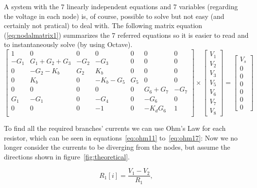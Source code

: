 A system with the 7 linearly independent equations and 7 variables (regarding the voltage in each node) is, of course, possible to solve but not easy (and certainly not pratical) to deal with. The following matrix equation (\ref{eq:nodalmatrix1}) summarizes the 7 referred equations so it is easier to read and to instantaneously solve (by using Octave).
\begin{equation}
\left[ \begin{array}{ccccccc} 
		1 & 0 & 0 & 0 & 0 & 0 & 0 \\ 
		-G_1 & G_1+G_2+G_3 & -G_2 & -G_3 & 0 & 0 & 0 \\
		0 & -G_2-K_b & G_2 & K_b & 0 & 0 & 0 \\ 
		0 & K_b & 0 & -K_b-G_5 & G_5 & 0 & 0  \\ 
		0 & 0 & 0 & 0 & 0 & G_6+G_7 & -G_7  \\ 
		G_1 & -G_1 & 0 & -G_4 & 0 & -G_6 & 0  \\ 
		0 & 0 & 0 & -1 & 0 & -K_dG_6 & 1 \\ 

\end{array} \right]
\times \left[ \begin{array}{c} V_1 \\ V_2 \\ V_3 \\ V_5 \\ V_6 \\ V_7 \\ V_8 \end{array} \right] =
\left[ \begin{array}{c} V_s \\ 0 \\ 0 \\ 0 \\ 0 \\ 0 \\ 0  \end{array} \right]
\label{eq:nodalmatrix1}
\end{equation}

To find all the required branches' currents we can use Ohm's Law for each resistor, which can be seen in equations~\ref{eq:ohm11} to~\ref{eq:ohm17}: Now we no longer consider the currents to be diverging from the nodes, but assume the directions shown in figure~\ref{fig:theoretical}.


\begin{equation}
  R_1[i] = \frac{V_1 - V_2}{R_1},
  \label{eq:ohm11}
\end{equation}

